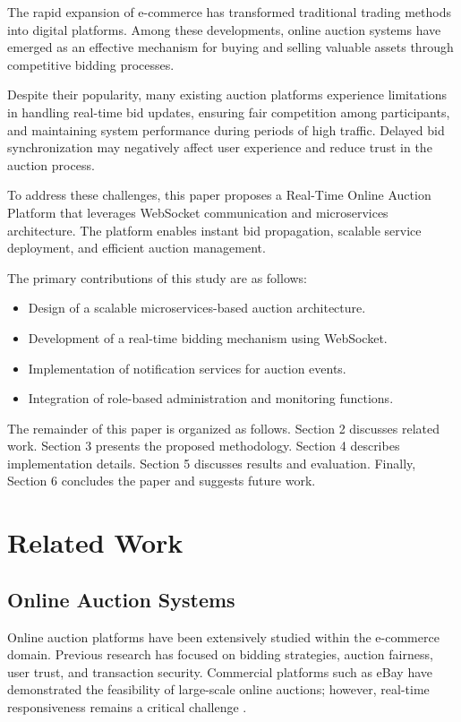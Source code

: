 \documentclass[runningheads]{llncs}
\begin{document}
The rapid expansion of e-commerce has transformed traditional trading methods into digital platforms. Among these developments, online auction systems have emerged as an effective mechanism for buying and selling valuable assets through competitive bidding processes.

Despite their popularity, many existing auction platforms experience limitations in handling real-time bid updates, ensuring fair competition among participants, and maintaining system performance during periods of high traffic. Delayed bid synchronization may negatively affect user experience and reduce trust in the auction process.

To address these challenges, this paper proposes a Real-Time Online Auction Platform that leverages WebSocket communication and microservices architecture. The platform enables instant bid propagation, scalable service deployment, and efficient auction management.

The primary contributions of this study are as follows:

\begin{itemize}
\item Design of a scalable microservices-based auction architecture.
\item Development of a real-time bidding mechanism using WebSocket.
\item Implementation of notification services for auction events.
\item Integration of role-based administration and monitoring functions.
\end{itemize}

The remainder of this paper is organized as follows. Section 2 discusses related work. Section 3 presents the proposed methodology. Section 4 describes implementation details. Section 5 discusses results and evaluation. Finally, Section 6 concludes the paper and suggests future work.

\section{Related Work}

\subsection{Online Auction Systems}

Online auction platforms have been extensively studied within the e-commerce domain. Previous research has focused on bidding strategies, auction fairness, user trust, and transaction security. Commercial platforms such as eBay have demonstrated the feasibility of large-scale online auctions; however, real-time responsiveness remains a critical challenge \cite{ebay}.
\end{document}
